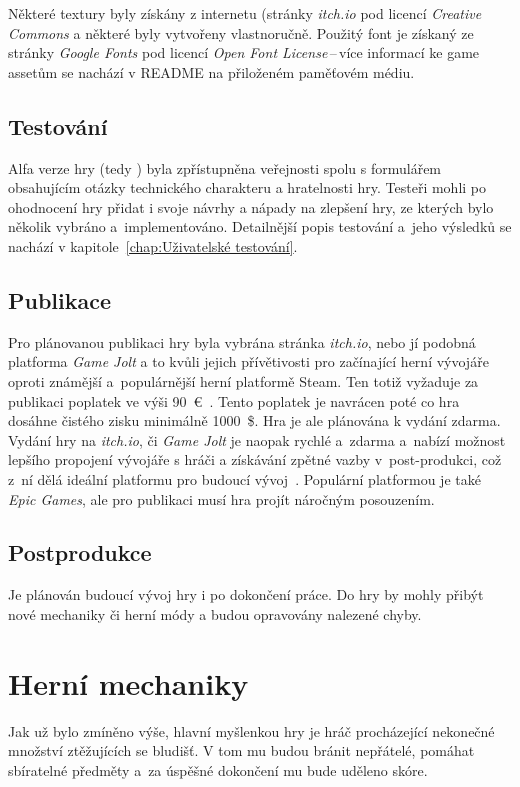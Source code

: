 Některé textury byly získány z internetu (stránky \textit{itch.io} pod licencí \textit{Creative Commons} a některé byly vytvořeny vlastnoručně. Použitý font je získaný ze stránky \textit{Google Fonts} pod licencí \textit{Open Font License}\,--\,více informací ke game assetům se nachází v README na přiloženém paměťovém médiu.

\subsection*{Testování}
Alfa verze hry (tedy ) byla zpřístupněna veřejnosti spolu s formulářem obsahujícím otázky technického charakteru a hratelnosti hry. Testeři mohli po ohodnocení hry přidat i svoje návrhy a nápady na zlepšení hry, ze kterých bylo několik vybráno a~implementováno. Detailnější popis testování a~jeho výsledků se nachází v kapitole~\ref{chap:Uživatelské testování}.


\subsection*{Publikace}
Pro plánovanou publikaci hry byla vybrána stránka \textit{itch.io}, nebo jí podobná platforma \textit{Game Jolt} a to kvůli jejich přívětivosti pro začínající herní vývojáře oproti známější a~populárnější herní platformě Steam. Ten totiž vyžaduje za publikaci poplatek ve výši 90~€~\cite{Steam_submission}. Tento poplatek je navrácen poté co hra dosáhne čistého zisku minimálně 1000~\$. Hra je ale plánována k vydání zdarma. Vydání hry na \textit{itch.io}, či \textit{Game Jolt} je naopak rychlé a~zdarma a~nabízí možnost lepšího propojení vývojáře s hráči a získávání zpětné vazby v~post-produkci, což z~ní dělá ideální platformu pro budoucí vývoj~\cite{GDevelop}. Populární platformou je také \textit{Epic Games}, ale pro publikaci musí hra projít náročným posouzením.

\subsection*{Postprodukce}
Je plánován budoucí vývoj hry i po dokončení práce. Do hry by mohly přibýt nové mechaniky či herní módy a budou opravovány nalezené chyby.

\section{Herní mechaniky}\label{chap:Herní mechaniky}
Jak už bylo zmíněno výše, hlavní myšlenkou hry je hráč procházející nekonečné množství ztěžujících se bludišť. V tom mu budou bránit nepřátelé, pomáhat sbíratelné předměty a~za úspěšné dokončení mu bude uděleno skóre.

